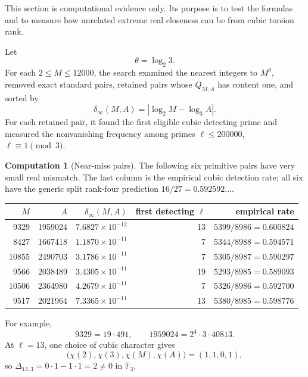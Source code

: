 \documentclass[11pt]{article}
\numberwithin{equation}{section}
\theoremstyle{definition}
\newtheorem{experiment}[theorem]{Computation}
\theoremstyle{remark}
\newcommand{\F}{\mathbb F}
\begin{document}
This section is computational evidence only.  Its purpose is to test the formulas and to
measure how unrelated extreme real closeness can be from cubic torsion rank.

Let
\[
 \theta=\log_2 3.
\]
For each \(2\le M\le12000\), the search examined the nearest integers to \(M^\theta\),
removed exact standard pairs, retained pairs whose \(Q_{M,A}\) has content one, and sorted by
\begin{equation}
 \delta_\infty(M,A)
 =\left|\log_2 M-\log_3 A\right|.\label{eq:realmismatch}
\end{equation}
For each retained pair, it found the first eligible cubic detecting prime and measured the
nonvanishing frequency among primes \(\ell\le200000\), \(\ell\equiv1\pmod3\).

\begin{experiment}[Near-miss pairs]
\label{comp:table}
The following six primitive pairs have very small real mismatch.  The last column is the
empirical cubic detection rate; all six have the generic split rank-four prediction
\(16/27=0.592592\ldots\).
\end{experiment}

\begin{center}
\small
\begin{tabular}{@{}rrrrr@{}}
\toprule
\(M\) & \(A\) & \(\delta_\infty(M,A)\) & first detecting \(\ell\) & empirical rate \\
\midrule
 9329 & 1959024 & \(7.6827\times10^{-12}\) & 13 & \(5399/8986=0.600824\) \\
 8427 & 1667418 & \(1.1870\times10^{-11}\) &  7 & \(5344/8988=0.594571\) \\
10855 & 2490703 & \(3.1786\times10^{-11}\) &  7 & \(5305/8987=0.590297\) \\
 9566 & 2038489 & \(3.4305\times10^{-11}\) & 19 & \(5293/8985=0.589093\) \\
10506 & 2364980 & \(4.2679\times10^{-11}\) &  7 & \(5326/8986=0.592700\) \\
 9517 & 2021964 & \(7.3365\times10^{-11}\) & 13 & \(5380/8985=0.598776\) \\
\bottomrule
\end{tabular}
\end{center}

For example,
\[
 9329=19\cdot491,
 \qquad
 1959024=2^4\cdot3\cdot40813.
\]
At \(\ell=13\), one choice of cubic character gives
\[
 \bigl(\chi(2),\chi(3),\chi(M),\chi(A)\bigr)=(1,1,0,1),
\]
so \(\Delta_{13,3}=0\cdot1-1\cdot1=2\ne0\) in \(\F_3\).
\end{document}

